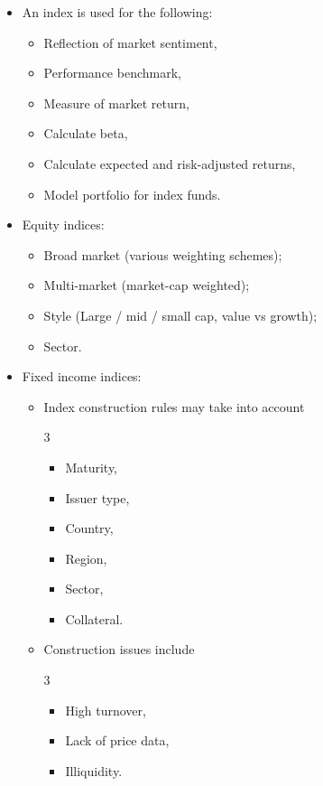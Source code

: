 \documentclass[../notes_compiled.tex]{subfiles}
\begin{document}
\begin{itemize}
\item An index is used for the following:
\begin{itemize}
\item Reflection of market sentiment,
\item Performance benchmark,
\item Measure of market return,
\item Calculate beta,
\item Calculate expected and risk-adjusted returns,
\item Model portfolio for index funds.
\end{itemize}

\item Equity indices:
\begin{itemize}
\item Broad market (various weighting schemes);
\item Multi-market (market-cap weighted);
\item Style (Large / mid / small cap, value vs growth);
\item Sector.
\end{itemize}

\item Fixed income indices:
\begin{itemize}
\item Index construction rules may take into account
\begin{multicols}{3}
\begin{itemize}
\item Maturity,
\item Issuer type,
\item Country,
\item Region,
\item Sector,
\item Collateral.
\end{itemize}
\end{multicols}
\item Construction issues include
\begin{multicols}{3}
\begin{itemize}
\item High turnover,
\item Lack of price data,
\item Illiquidity.
\end{itemize}
\end{multicols}
\end{itemize}


\end{itemize}
\end{document}
